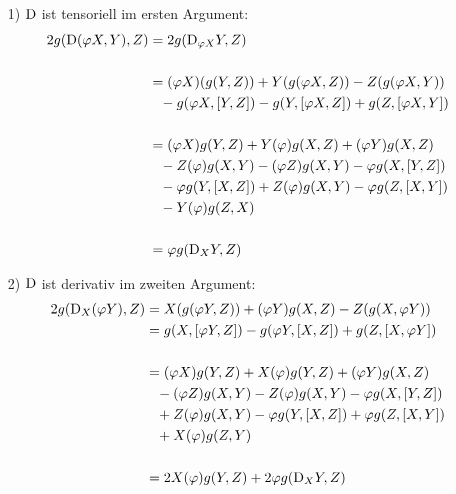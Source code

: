 \begin{bew}
\begin{enumerate}
\item[1) ] $\mathrm{D}$ ist tensoriell im ersten Argument:
\begin{align*}
2g(\mathrm{D}(\varphi X, Y),Z) &= 2g(\mathrm{D}_{\varphi X}Y, Z) \\
									\phantom{.}\\
									 &= (\varphi X)(g(Y, Z)) + Y(g(\varphi X, Z)) - Z(g(\varphi X, Y)) \\
									 &\phantom{=}- g(\varphi X, [Y, Z])  - g(Y, [\varphi X, Z]) + g(Z, [\varphi X,Y]) \\
									 \phantom{.}\\
									 &= (\varphi X) g(Y, Z) + Y(\varphi)g(X, Z) +(\varphi Y)g(X, Z) \\
									 &\phantom{=}- Z(\varphi)g(X, Y) - (\varphi Z) g(X, Y) - \varphi g(X, [Y, Z]) \\
									 &\phantom{=}-\varphi g(Y, [X, Z]) + Z(\varphi) g(X, Y) - \varphi g(Z, [X, Y]) \\
									 &\phantom{=}-Y(\varphi)g(Z, X)	\\
									 \phantom{.}\\
									 &= \varphi g(\mathrm{D}_XY, Z)							 
\end{align*}
\item[2) ] $\mathrm{D}$ ist derivativ im zweiten Argument:
\begin{align*}
2g(\mathrm{D}_X(\varphi Y), Z) &= X(g(\varphi Y, Z))	+ (\varphi Y) g(X, Z) - Z(g(X, \varphi Y))		\\
										&= g(X, [\varphi Y, Z]) - g(\varphi Y, [X, Z]) + g(Z, [X, \varphi Y]) \\
										\phantom{.}\\
										&= (\varphi X) g(Y, Z) + X(\varphi) g(Y, Z) + (\varphi Y)g(X, Z) \\
										&\phantom{=} - (\varphi Z)g(X, Y) - Z(\varphi)g(X, Y) - \varphi g(X, [Y, Z]) \\
										&\phantom{=}+ Z(\varphi)g(X, Y) - \varphi g(Y, [X, Z]) + \varphi g(Z, [X, Y]) \\
										&\phantom{=}+ X(\varphi)g(Z, Y)\\
										\phantom{.}\\
										&= 2X(\varphi) g(Y, Z) + 2\varphi g(\mathrm{D}_XY,Z)																										
\end{align*}
\end{enumerate}
\end{bew}

